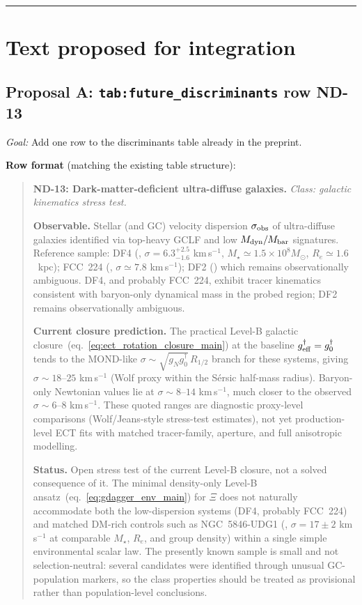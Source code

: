 \documentclass[11pt]{article}
\begin{document}
\bigskip\hrule\bigskip

\section{Text proposed for integration}

\subsection{Proposal A: {\tt tab:future\_discriminants} row ND-13}

\textit{Goal:} Add one row to the discriminants table already in the
preprint.

\textbf{Row format} (matching the existing table structure):

\begin{quote}\small
\textbf{ND-13: Dark-matter-deficient ultra-diffuse galaxies.}
\textit{Class: galactic kinematics stress test.}

\textbf{Observable.} Stellar (and GC) velocity dispersion
$\sigma_{\rm obs}$ of ultra-diffuse galaxies identified via top-heavy
GCLF and low $M_{\rm dyn}/M_{\rm bar}$ signatures. Reference sample:
DF4 (\cite{Danieli2022DF4}, $\sigma=6.3^{+2.5}_{-1.6}$ km\,s$^{-1}$,
$M_\star\simeq 1.5\times 10^{8}M_\odot$, $R_e\simeq 1.6$~kpc);
FCC~224 (\cite{Buzzo2025FCC224,Tang2025FCC224},
$\sigma\simeq 7.8$ km\,s$^{-1}$); DF2
(\cite{Trujillo2019DF2,Shen2021DF2TRGB}) which remains observationally
ambiguous. DF4, and probably FCC~224, exhibit tracer kinematics
consistent with baryon-only dynamical mass in the probed region; DF2
remains observationally ambiguous.

\textbf{Current closure prediction.} The practical Level-B galactic
closure~(eq.~\ref{eq:ect_rotation_closure_main}) at the baseline
$g^\dagger_{\rm eff}=g^\dagger_0$ tends to the MOND-like
$\sigma\sim\sqrt{g_N g^\dagger_0}\,R_{1/2}$ branch for these systems,
giving $\sigma\sim 18$--$25$ km\,s$^{-1}$ (Wolf proxy within the
S\'ersic half-mass radius). Baryon-only Newtonian values lie at
$\sigma\sim 8$--$14$ km\,s$^{-1}$, much closer to the observed
$\sigma\sim 6$--$8$ km\,s$^{-1}$. These quoted ranges are diagnostic
proxy-level comparisons (Wolf/Jeans-style stress-test estimates), not
yet production-level ECT fits with matched tracer-family, aperture,
and full anisotropic modelling.

\textbf{Status.} Open stress test of the current Level-B closure, not
a solved consequence of it. The minimal density-only Level-B
ansatz~(eq.~\ref{eq:gdagger_env_main}) for $\Xi$ does not naturally
accommodate both the low-dispersion systems (DF4, probably FCC~224)
and matched DM-rich controls such as NGC~5846-UDG1
(\cite{Forbes2021NGC5846UDG1}, $\sigma=17\pm 2$ km\,s$^{-1}$ at
comparable $M_\star$, $R_e$, and group density) within a single
simple environmental scalar law. The presently known sample is small
and not selection-neutral: several candidates were identified through
unusual GC-population markers, so the class properties should be
treated as provisional rather than population-level conclusions.


\end{quote}
\end{document}
